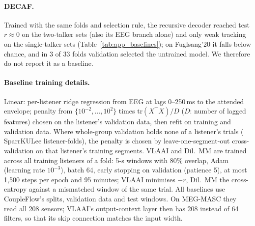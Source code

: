 \documentclass[10pt,twocolumn,letterpaper]{article}
\begin{document}
\paragraph{DECAF.} Trained with the same folds and selection rule, the recursive decoder
reached test $r\approx0$ on the two-talker sets (also its EEG branch alone) and only weak
tracking on the single-talker sets (Table~\ref{tab:app_baselines}); on Fuglsang'20 it falls
below chance, and in 3 of 33 folds validation selected the untrained model. We therefore do
not report it as a baseline.

\paragraph{Baseline training details.} Linear: per-listener ridge regression from EEG at lags
0--250\,ms to the attended envelope; penalty from $\{10^{-2},\dots,10^{2}\}$ times
$\mathrm{tr}(X^\top X)/D$ ($D$: number of lagged features) chosen on the listener's validation
data, then refit on training and validation data. Where whole-group validation holds none of a
listener's trials (\linInnerCV{} SparrKULee listener-folds), the penalty is chosen by
leave-one-segment-out cross-validation on that listener's training segments. VLAAI and Dil.\ MM are trained across all training listeners of a fold:
5-s windows with 80\% overlap, Adam (learning rate $10^{-3}$), batch 64, early stopping on
validation (patience 5), at most 1{,}500 steps per epoch and 95 minutes; VLAAI minimises
$-r$, Dil.\ MM the cross-entropy against a mismatched window of the same trial. All baselines use CoupleFlow's splits, validation data and test windows. On MEG-MASC they
read all 208 sensors; VLAAI's output-context layer then has 208 instead of 64 filters, so that
its skip connection matches the input width.
\end{document}
